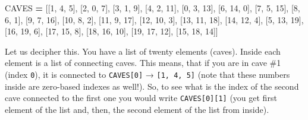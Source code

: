 \documentclass[
]{book}
\newenvironment{Shaded}{\begin{snugshade}}{\end{snugshade}}
\newcommand{\DecValTok}[1]{\textcolor[rgb]{0.00,0.00,0.81}{#1}}
\newcommand{\NormalTok}[1]{#1}
\newcommand{\OperatorTok}[1]{\textcolor[rgb]{0.81,0.36,0.00}{\textbf{#1}}}
\begin{document}
\begin{Shaded}
\begin{Highlighting}[]
\NormalTok{CAVES }\OperatorTok{=}\NormalTok{ [[}\DecValTok{1}\NormalTok{, }\DecValTok{4}\NormalTok{, }\DecValTok{5}\NormalTok{], [}\DecValTok{2}\NormalTok{, }\DecValTok{0}\NormalTok{, }\DecValTok{7}\NormalTok{], [}\DecValTok{3}\NormalTok{, }\DecValTok{1}\NormalTok{, }\DecValTok{9}\NormalTok{], [}\DecValTok{4}\NormalTok{, }\DecValTok{2}\NormalTok{, }\DecValTok{11}\NormalTok{], }
\NormalTok{         [}\DecValTok{0}\NormalTok{, }\DecValTok{3}\NormalTok{, }\DecValTok{13}\NormalTok{], [}\DecValTok{6}\NormalTok{, }\DecValTok{14}\NormalTok{, }\DecValTok{0}\NormalTok{], [}\DecValTok{7}\NormalTok{, }\DecValTok{5}\NormalTok{, }\DecValTok{15}\NormalTok{], [}\DecValTok{8}\NormalTok{, }\DecValTok{6}\NormalTok{, }\DecValTok{1}\NormalTok{], }
\NormalTok{         [}\DecValTok{9}\NormalTok{, }\DecValTok{7}\NormalTok{, }\DecValTok{16}\NormalTok{], [}\DecValTok{10}\NormalTok{, }\DecValTok{8}\NormalTok{, }\DecValTok{2}\NormalTok{], [}\DecValTok{11}\NormalTok{, }\DecValTok{9}\NormalTok{, }\DecValTok{17}\NormalTok{], [}\DecValTok{12}\NormalTok{, }\DecValTok{10}\NormalTok{, }\DecValTok{3}\NormalTok{], }
\NormalTok{         [}\DecValTok{13}\NormalTok{, }\DecValTok{11}\NormalTok{, }\DecValTok{18}\NormalTok{], [}\DecValTok{14}\NormalTok{, }\DecValTok{12}\NormalTok{, }\DecValTok{4}\NormalTok{], [}\DecValTok{5}\NormalTok{, }\DecValTok{13}\NormalTok{, }\DecValTok{19}\NormalTok{], [}\DecValTok{16}\NormalTok{, }\DecValTok{19}\NormalTok{, }\DecValTok{6}\NormalTok{], }
\NormalTok{         [}\DecValTok{17}\NormalTok{, }\DecValTok{15}\NormalTok{, }\DecValTok{8}\NormalTok{], [}\DecValTok{18}\NormalTok{, }\DecValTok{16}\NormalTok{, }\DecValTok{10}\NormalTok{], [}\DecValTok{19}\NormalTok{, }\DecValTok{17}\NormalTok{, }\DecValTok{12}\NormalTok{], [}\DecValTok{15}\NormalTok{, }\DecValTok{18}\NormalTok{, }\DecValTok{14}\NormalTok{]]}
\end{Highlighting}
\end{Shaded}

Let us decipher this. You have a list of twenty elements (caves). Inside each element is a list of connecting caves. This means, that if you are in cave \#1 (index \texttt{0}), it is connected to \texttt{CAVES{[}0{]}} → \texttt{{[}1,\ 4,\ 5{]}} (note that these numbers inside are zero-based indexes as well!). So, to see what is the index of the second cave connected to the first one you would write \texttt{CAVES{[}0{]}{[}1{]}} (you get first element of the list and, then, the second element of the list from inside).
\end{document}
